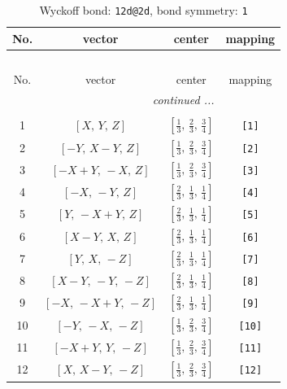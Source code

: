 \documentclass[fleqn,8pt]{jsarticle}
\begin{document}
\begin{longtable}{cccc}
\caption{Wyckoff bond: {\tt 12d@2d}, bond symmetry: {\tt 1}}
 \\
 \hline \hline
No. & vector & center & mapping \\ \hline \endfirsthead

\multicolumn{3}{l}{\tablename\ \thetable{}} \\
 \hline \hline
No. & vector & center & mapping \\ \hline \endhead

 \hline \hline
\multicolumn{3}{r}{\footnotesize\it continued ...} \\ \endfoot

 \hline \hline
\multicolumn{3}{r}{} \\ \endlastfoot

1 & $\left[ X,\, Y,\, Z \right]$ & $\left[ \frac{1}{3},\, \frac{2}{3},\, \frac{3}{4} \right]$ & {\tt [1]} \\ \hline
2 & $\left[ - Y,\, X - Y,\, Z \right]$ & $\left[ \frac{1}{3},\, \frac{2}{3},\, \frac{3}{4} \right]$ & {\tt [2]} \\ \hline
3 & $\left[ - X + Y,\, - X,\, Z \right]$ & $\left[ \frac{1}{3},\, \frac{2}{3},\, \frac{3}{4} \right]$ & {\tt [3]} \\ \hline
4 & $\left[ - X,\, - Y,\, Z \right]$ & $\left[ \frac{2}{3},\, \frac{1}{3},\, \frac{1}{4} \right]$ & {\tt [4]} \\ \hline
5 & $\left[ Y,\, - X + Y,\, Z \right]$ & $\left[ \frac{2}{3},\, \frac{1}{3},\, \frac{1}{4} \right]$ & {\tt [5]} \\ \hline
6 & $\left[ X - Y,\, X,\, Z \right]$ & $\left[ \frac{2}{3},\, \frac{1}{3},\, \frac{1}{4} \right]$ & {\tt [6]} \\ \hline
7 & $\left[ Y,\, X,\, - Z \right]$ & $\left[ \frac{2}{3},\, \frac{1}{3},\, \frac{1}{4} \right]$ & {\tt [7]} \\ \hline
8 & $\left[ X - Y,\, - Y,\, - Z \right]$ & $\left[ \frac{2}{3},\, \frac{1}{3},\, \frac{1}{4} \right]$ & {\tt [8]} \\ \hline
9 & $\left[ - X,\, - X + Y,\, - Z \right]$ & $\left[ \frac{2}{3},\, \frac{1}{3},\, \frac{1}{4} \right]$ & {\tt [9]} \\ \hline
10 & $\left[ - Y,\, - X,\, - Z \right]$ & $\left[ \frac{1}{3},\, \frac{2}{3},\, \frac{3}{4} \right]$ & {\tt [10]} \\ \hline
11 & $\left[ - X + Y,\, Y,\, - Z \right]$ & $\left[ \frac{1}{3},\, \frac{2}{3},\, \frac{3}{4} \right]$ & {\tt [11]} \\ \hline
12 & $\left[ X,\, X - Y,\, - Z \right]$ & $\left[ \frac{1}{3},\, \frac{2}{3},\, \frac{3}{4} \right]$ & {\tt [12]} \\
\end{longtable}
\end{document}
